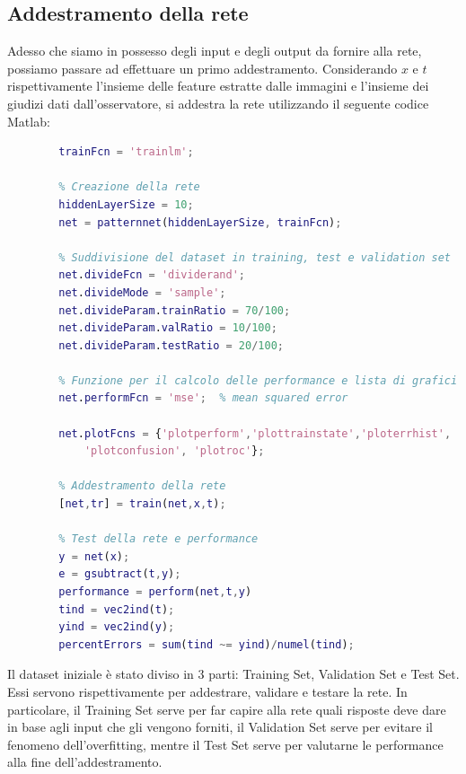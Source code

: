 \documentclass[a4paper,11pt]{article}
\begin{document}
    \subsection{Addestramento della rete}
    Adesso che siamo in possesso degli input e degli output da fornire alla rete, possiamo passare ad effettuare un primo addestramento.
    Considerando $x$ e $t$ rispettivamente l'insieme delle feature estratte dalle immagini e l'insieme dei giudizi dati dall'osservatore, si addestra la rete
    utilizzando il seguente codice Matlab:
    \begin{lstlisting}[language=Matlab]        
        % Funzione di training
        trainFcn = 'trainlm';  
        
        % Creazione della rete
        hiddenLayerSize = 10;
        net = patternnet(hiddenLayerSize, trainFcn);
        
        % Suddivisione del dataset in training, test e validation set
        net.divideFcn = 'dividerand'; 
        net.divideMode = 'sample'; 
        net.divideParam.trainRatio = 70/100;
        net.divideParam.valRatio = 10/100;
        net.divideParam.testRatio = 20/100;
        
        % Funzione per il calcolo delle performance e lista di grafici da generare
        net.performFcn = 'mse';  % mean squared error
        
        net.plotFcns = {'plotperform','plottrainstate','ploterrhist', ...
            'plotconfusion', 'plotroc'};
        
        % Addestramento della rete
        [net,tr] = train(net,x,t);
        
        % Test della rete e performance
        y = net(x);
        e = gsubtract(t,y);
        performance = perform(net,t,y)
        tind = vec2ind(t);
        yind = vec2ind(y);
        percentErrors = sum(tind ~= yind)/numel(tind);
    \end{lstlisting}
    Il dataset iniziale è stato diviso in 3 parti: Training Set, Validation Set e Test Set. Essi servono rispettivamente per addestrare, validare e testare la rete.
    In particolare, il Training Set serve per far capire alla rete quali risposte deve dare in base agli input che gli vengono forniti, il Validation Set serve per evitare il fenomeno dell'overfitting, mentre il Test Set serve per valutarne le performance alla fine dell'addestramento.
    \newpage
\end{document}
